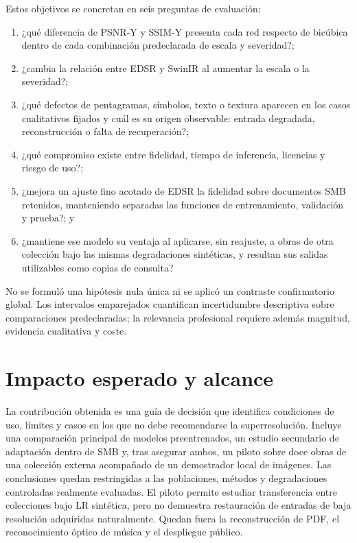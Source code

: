 Estos objetivos se concretan en seis preguntas de evaluación:
\begin{enumerate}
  \item ¿qué diferencia de PSNR-Y y SSIM-Y presenta cada red respecto de bicúbica dentro de cada
        combinación predeclarada de escala y severidad?;
  \item ¿cambia la relación entre EDSR y SwinIR al aumentar la escala o la severidad?;
  \item ¿qué defectos de pentagramas, símbolos, texto o textura aparecen en los casos cualitativos
        fijados y cuál es su origen observable: entrada degradada, reconstrucción o falta de
        recuperación?;
  \item ¿qué compromiso existe entre fidelidad, tiempo de inferencia, licencias y riesgo de uso?;
  \item ¿mejora un ajuste fino acotado de EDSR la fidelidad sobre documentos SMB retenidos, manteniendo
        separadas las funciones de entrenamiento, validación y prueba?; y
  \item ¿mantiene ese modelo su ventaja al aplicarse, sin reajuste, a obras de otra colección bajo
        las mismas degradaciones sintéticas, y resultan sus salidas utilizables como copias de
        consulta?
\end{enumerate}
No se formuló una hipótesis nula única ni se aplicó un contraste confirmatorio global. Los
intervalos emparejados cuantifican incertidumbre descriptiva sobre comparaciones predeclaradas;
la relevancia profesional requiere además magnitud, evidencia cualitativa y coste.

\section{Impacto esperado y alcance}
La contribución obtenida es una guía de decisión que identifica condiciones de uso, límites y
casos en los que no debe recomendarse la superresolución. Incluye una comparación principal de
modelos preentrenados, un estudio secundario de adaptación dentro de SMB y, tras asegurar ambos, un
piloto sobre doce obras de una colección externa acompañado de un demostrador local de imágenes.
Las conclusiones quedan restringidas a las poblaciones, métodos y degradaciones controladas
realmente evaluadas. El piloto permite estudiar transferencia entre colecciones bajo LR sintética,
pero no demuestra restauración de entradas de baja resolución adquiridas naturalmente. Quedan
fuera la reconstrucción de PDF, el reconocimiento óptico de música y el despliegue público.

